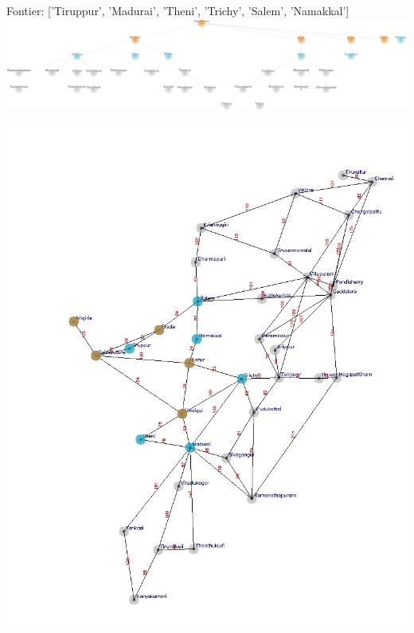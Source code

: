 \documentclass[xcolor=table]{beamer}
\begin{document}
\begin{frame}
  { \tiny Fontier: ['Tiruppur', 'Madurai', 'Theni', 'Trichy', 'Salem', 'Namakkal'] }
  \includegraphics[width=1\textwidth]{../BFSNodes/7-1.png}
  \begin{center}
    \includegraphics[height=0.6\textheight]{../BFSoutput/tamilBFS5.jpg}
  \end{center}
\end{frame}
\end{document}
